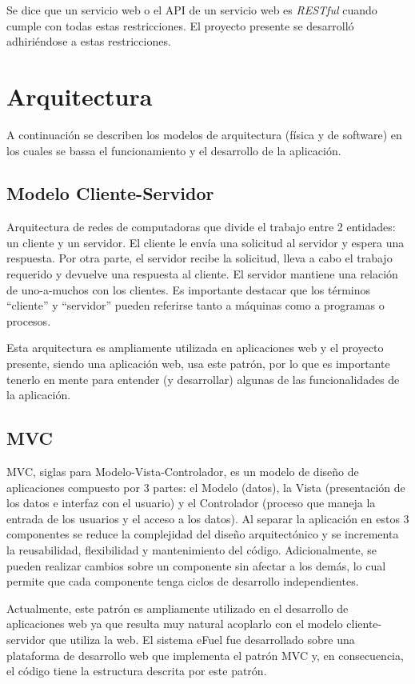     Se dice que un servicio web o el API de un servicio web es \textit{RESTful} cuando cumple con todas estas restricciones. El proyecto presente se desarrolló adhiriéndose a estas restricciones.

\section{Arquitectura}
A continuación se describen los modelos de arquitectura (física y de software) en los cuales se bassa el funcionamiento y el desarrollo de la aplicación.

    \subsection{Modelo Cliente-Servidor} \label{clientServer}
    Arquitectura de redes de computadoras que divide el trabajo entre 2 entidades: un cliente y un servidor. El cliente le envía una solicitud al servidor y espera una respuesta. Por otra parte, el servidor recibe la solicitud, lleva a cabo el trabajo requerido y devuelve una respuesta al cliente. \cite{redesTanenbaum} El servidor mantiene una relación de uno-a-muchos con los clientes. Es importante destacar que los términos “cliente” y “servidor” pueden referirse tanto a máquinas como a programas o procesos.

    Esta arquitectura es ampliamente utilizada en aplicaciones web y el proyecto presente, siendo una aplicación web, usa este patrón, por lo que es importante tenerlo en mente para entender (y desarrollar) algunas de las funcionalidades de la aplicación.

    \subsection{MVC} \label{mvc}
    MVC, siglas para Modelo-Vista-Controlador, es un modelo de diseño de aplicaciones compuesto por 3 partes: el Modelo (datos), la Vista (presentación de los datos e interfaz con el usuario) y el Controlador (proceso que maneja la entrada de los usuarios y el acceso a los datos). \cite{mvcKrasner} Al separar la aplicación en estos 3 componentes se reduce la complejidad del diseño arquitectónico y se incrementa la reusabilidad, flexibilidad y mantenimiento del código. Adicionalmente, se pueden realizar cambios sobre un componente sin afectar a los demás, lo cual permite que cada componente tenga ciclos de desarrollo independientes.

    Actualmente, este patrón es ampliamente utilizado en el desarrollo de aplicaciones web ya que resulta muy natural acoplarlo con el modelo cliente-servidor que utiliza la web. El sistema eFuel fue desarrollado sobre una plataforma de desarrollo web que implementa el patrón MVC y, en consecuencia, el código tiene la estructura descrita por este patrón.